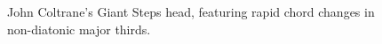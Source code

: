 \begin{figure}[ht]
    \centering
    \caption[Giant Steps]{\small{John Coltrane's Giant Steps head, featuring rapid chord changes in non-diatonic major thirds.}}
    \label{fig:giant_steps}
\end{figure}


